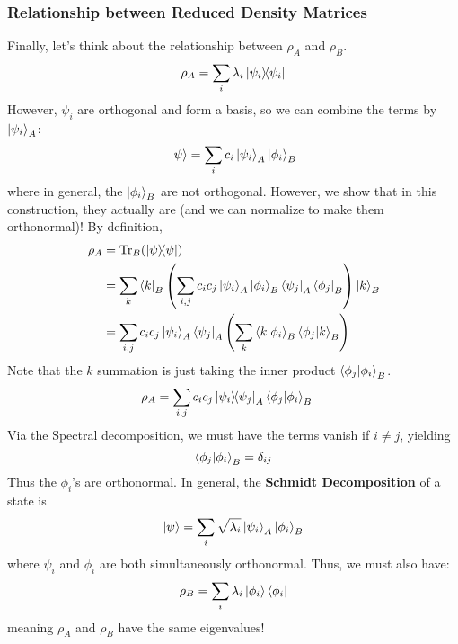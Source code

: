 \subsubsection{Relationship between Reduced Density Matrices}
Finally, let's think about the relationship between $\rho_A$ and $\rho_B$.
\[ \rho_A = \sum_i \lambda_i \ketbra{\psi_i}{\psi_i} \]
However, $\psi_i$ are orthogonal and form a basis, so we can combine the terms by $\ket{\psi_i}_A$:
\[ \ket{\psi} = \sum_i c_i \ket{\psi_i}_{A} \ket{\phi_i}_B \]
where in general, the $\ket{\phi_i}_B$ are not orthogonal. However, we show that in this construction, they actually are (and we can normalize to make them orthonormal)! %
By definition,
\begin{align*}
    \rho_A &= \Tr_B(\ketbra{\psi}{\psi}) \\
    &= \sum_k \bra{k}_B \qty(\sum_{i,j} c_i c_j \ket{\psi_i}_A \ket{\phi_i}_B \bra{\psi_j}_A \bra{\phi_j}_B) \ket{k}_B \\
    &= \sum_{i,j} c_i c_j \ket{\psi_i}_A \bra{\psi_j}_A \qty(\sum_k  \braket{k}{\phi_i}_B \braket{\phi_j}{k}_B)
\end{align*}
Note that the $k$ summation is just taking the inner product $\braket{\phi_j}{\phi_i}_B$.
\begin{align*}
    \rho_A &= \sum_{i, j}  c_i c_j \ketbra{\psi_i}{\psi_j}_A \braket{\phi_j}{\phi_i}_B
\end{align*}
Via the Spectral decomposition, we must have the terms vanish if $i \neq j$, yielding
\[ \braket{\phi_j}{\phi_i}_B = \delta_{ij} \]
Thus the $\phi_i$'s are orthonormal. In general, the \textbf{Schmidt Decomposition} of a state is
\[ \ket{\psi} = \sum_i \sqrt{\lambda_i} \ket{\psi_i}_A \ket{\phi_i}_B \]
where $\psi_i$ and $\phi_i$ are both simultaneously orthonormal. Thus, we must also have:
\[ \rho_B = \sum_i \lambda_i \ket{\phi_i}\bra{\phi_i} \]
meaning $\rho_A$ and $\rho_B$ have the same eigenvalues!
